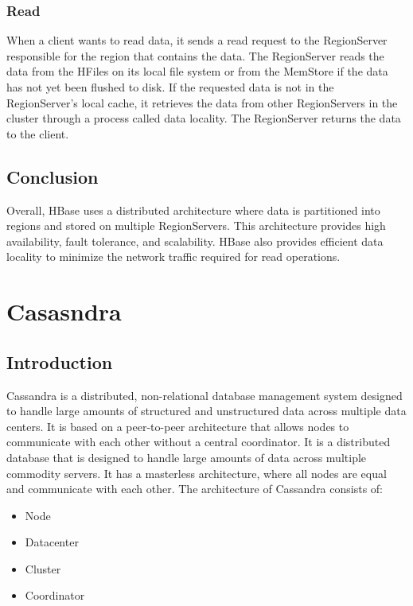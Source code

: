 \documentclass[12pt]{article}
\begin{document}
\subsubsection{Read}
When a client wants to read data, it sends a read request to the RegionServer responsible for the region that contains the data. The RegionServer reads the data from the HFiles on its local file system or from the MemStore if the data has not yet been flushed to disk. If the requested data is not in the RegionServer's local cache, it retrieves the data from other RegionServers in the cluster through a process called data locality. The RegionServer returns the data to the client.
\subsection{Conclusion}
Overall, HBase uses a distributed architecture where data is partitioned into regions and stored on multiple RegionServers. This architecture provides high availability, fault tolerance, and scalability. HBase also provides efficient data locality to minimize the network traffic required for read operations.
\pagebreak
\section{Casasndra}
\subsection{Introduction}
Cassandra is a distributed, non-relational database management system designed to handle large amounts of structured and unstructured data across multiple data centers. It is based on a peer-to-peer architecture that allows nodes to communicate with each other without a central coordinator. It is a distributed database that is designed to handle large amounts of data across multiple commodity servers. It has a masterless architecture, where all nodes are equal and communicate with each other.
The architecture of Cassandra consists of:
\begin{itemize}
    \item Node
    \item Datacenter
    \item Cluster
    \item Coordinator
\end{itemize} 
 
\end{document}
